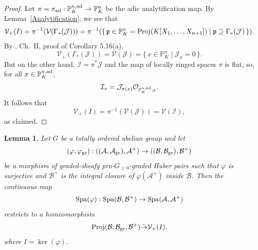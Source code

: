 \documentclass[12pt,twoside,a4paper]{article}
\newtheorem{lemma}[thm]{Lemma}
\theoremstyle{definition}
\theoremstyle{remark}
\newcommand\ad{{\rm ad}}
\newcommand\gr{{\rm gr}}
\newcommand\Proj{{\rm Proj}}
\newcommand\Spa{{\rm Spa}}
\begin{document}
\begin{proof}Let $\pi=\pi_{\ad}: \mathbb{P}_{K}^{n,\ad}\to \mathbb{P}_{K}^{n}$ be the adic analytification map. By Lemma~\ref{Analytification}, we see that \begin{equation*}\mathcal{V}_{+}(I)=\pi^{-1}(\mathcal{V}(\Gamma_{\ast}(\mathcal{J})))=\pi^{-1}(\{\, \mathfrak{p}\in \mathbb{P}_{K}^{n}=\Proj(K[X_1,\dots, X_{n+1}])\mid \mathfrak{p}\supseteq \Gamma_{\ast}(\mathcal{J})\,\}).\end{equation*}By \cite{Hartshorne}, Ch.~II, proof of Corollary 5.16(a), \begin{equation*}\mathcal{V}_{+}(\Gamma_{\ast}(\mathcal{J}))=\mathcal{V}(\mathcal{J})=\{\, x\in \mathbb{P}_{K}^{n}\mid \mathcal{J}_{x}=0\,\}.\end{equation*}But on the other hand, $\mathcal{I}=\pi^{\ast}\mathcal{J}$ and the map of locally ringed spaces $\pi$ is flat, so, for all $x\in \mathbb{P}_{K}^{n,\ad}$, \begin{equation*}\mathcal{I}_{x}=\mathcal{J}_{\pi(x)}\mathcal{O}_{\mathbb{P}_{K}^{n,\ad}, x}.\end{equation*}It follows that \begin{equation*}\mathcal{V}_{+}(I)=\pi^{-1}(\mathcal{V}(\mathcal{J}))=\mathcal{V}(\mathcal{I}),\end{equation*}as claimed.  \end{proof}
\begin{lemma}\label{Surjection of pro-graded Huber pairs}Let $G$ be a totally ordered abelian group and let \begin{equation*}(\varphi, \varphi_{\gr}): ((\mathcal{A}, \mathcal{A}_{\gr}), \mathcal{A}^{+})\to ((\mathcal{B}, \mathcal{B}_{\gr}), \mathcal{B}^{+})\end{equation*}be a morphism of graded-sheafy pro-$G_{\geq0}$-graded Huber pairs such that $\varphi$ is surjective and $\mathcal{B}^{+}$ is the integral closure of $\varphi(\mathcal{A}^{+})$ inside $\mathcal{B}$. Then the continuous map \begin{equation*}\Spa(\varphi): \Spa(\mathcal{B}, \mathcal{B}^{+})\to \Spa(\mathcal{A}, \mathcal{A}^{+})\end{equation*}restricts to a homeomorphism \begin{equation*}\Proj(\mathcal{B}, \mathcal{B}_{\gr}, \mathcal{B}^{+})\tilde{\to} \mathcal{V}_{+}(I),\end{equation*}where $I=\ker(\varphi)$.\end{lemma}
\end{document}
